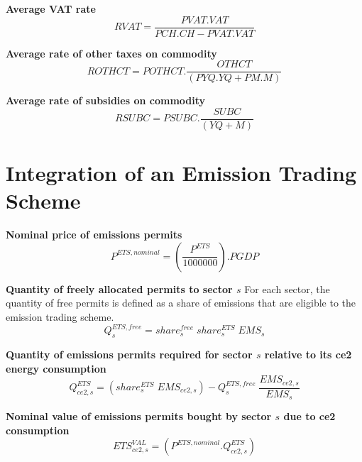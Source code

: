 \documentclass[12pt]{article}
\numberwithin{equation}{section}
\begin{document}
\noindent \textbf{Average VAT rate} 
\begin{dmath}
RVAT = \frac{PVAT . VAT}{PCH . CH - PVAT . VAT}
\label{Exception_taxes_prices.mdlRVAT}
\end{dmath}

\noindent \textbf{Average rate of other taxes on commodity} 
\begin{dmath}
ROTHCT = POTHCT . \frac{OTHCT}{\left( PYQ . YQ + PM . M \right)}
\label{Exception_taxes_prices.mdlROTHCT}
\end{dmath}

\noindent \textbf{Average rate of subsidies on commodity} 
\begin{dmath}
RSUBC = PSUBC . \frac{SUBC}{\left( YQ + M \right)}
\label{Exception_taxes_prices.mdlRSUBC}
\end{dmath}


\section{Integration of an Emission Trading Scheme}



\noindent \textbf{Nominal price of emissions permits} 
\begin{dmath}
P^{ETS,nominal} = \left( \frac{P^{ETS}}{1000000} \right) . PGDP
\label{ETS.mdlP_ETS_nominal}
\end{dmath}

\noindent \textbf{Quantity of freely allocated permits to sector $s$} 
For each sector, the quantity of free permits is defined as a share of emissions that are eligible to the emission trading scheme. \\
\begin{dmath}
Q^{ETS,free}_{s} = share^{free}_{s} \; share^{ETS}_{s} \; EMS_{s}
\label{ETS.mdlQ_ETS_free[s]}
\end{dmath}

\noindent \textbf{Quantity of emissions permits required for sector $s$ relative to its ce2 energy consumption} 
\begin{dmath}
Q^{ETS}_{ce2, s} = \left( share^{ETS}_{s} \; EMS_{ce2, s} \right) - Q^{ETS,free}_{s} \; \frac{EMS_{ce2, s}}{EMS_{s}}
\label{ETS.mdlQ_ETS[ce2, s]}
\end{dmath}

\noindent \textbf{Nominal value of emissions permits bought by sector $s$ due to ce2 consumption} 
\begin{dmath}
ETS^{VAL}_{ce2, s} = \left( P^{ETS,nominal} . Q^{ETS}_{ce2, s} \right)
\label{ETS.mdlETS_VAL[ce2, s]}
\end{dmath}
\end{document}

